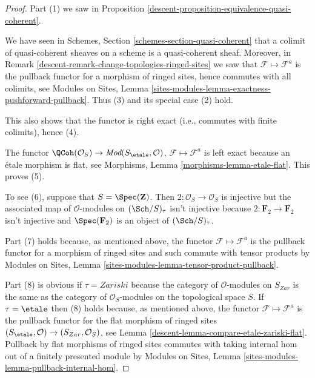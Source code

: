\begin{proof}

Part (1) we saw in
Proposition \ref{descent-proposition-equivalence-quasi-coherent}.

\medskip\noindent
We have seen in
Schemes, Section \ref{schemes-section-quasi-coherent}
that a colimit of quasi-coherent sheaves on a scheme is a quasi-coherent
sheaf. Moreover, in
Remark \ref{descent-remark-change-topologies-ringed-sites}
we saw that $\mathcal{F} \mapsto \mathcal{F}^a$ is the pullback functor
for a morphism of ringed sites, hence commutes with all colimits, see
Modules on Sites, Lemma
\ref{sites-modules-lemma-exactness-pushforward-pullback}.
Thus (3) and its special case (2) hold.

\medskip\noindent
This also shows that the functor is right exact (i.e., commutes with
finite colimits), hence (4).

\medskip\noindent
The functor $\QCoh(\mathcal{O}_S) \to
\textit{Mod}(S_\etale, \mathcal{O})$,
$\mathcal{F} \mapsto \mathcal{F}^a$
is left exact because an \'etale morphism is flat, see
Morphisms, Lemma \ref{morphisms-lemma-etale-flat}.
This proves (5).

\medskip\noindent
To see (6), suppose that $S = \Spec(\mathbf{Z})$.
Then $2 : \mathcal{O}_S \to \mathcal{O}_S$ is injective but the associated
map of $\mathcal{O}$-modules on $(\Sch/S)_\tau$ isn't
injective because $2 : \mathbf{F}_2 \to \mathbf{F}_2$ isn't injective
and $\Spec(\mathbf{F}_2)$ is an object of $(\Sch/S)_\tau$.

\medskip\noindent
Part (7) holds because, as mentioned above, the functor
$\mathcal{F} \mapsto \mathcal{F}^a$ is the pullback functor
for a morphism of ringed sites and such commute with tensor
products by Modules on Sites, Lemma
\ref{sites-modules-lemma-tensor-product-pullback}.

\medskip\noindent
Part (8) is obvious if $\tau = Zariski$ because the category of
$\mathcal{O}$-modules on $S_{Zar}$ is the same as the category
of $\mathcal{O}_S$-modules on the topological space $S$.
If $\tau = \etale$ then (8) holds because, as mentioned above,
the functor $\mathcal{F} \mapsto \mathcal{F}^a$ is the pullback functor
for the flat morphism of ringed sites
$(S_\etale, \mathcal{O}) \to (S_{Zar}, \mathcal{O}_S)$, see
Lemma \ref{descent-lemma-compare-etale-zariski-flat}.
Pullback by flat morphisms of ringed sites commutes with
taking internal hom out of a finitely presented module by
Modules on Sites, Lemma \ref{sites-modules-lemma-pullback-internal-hom}.


\end{proof}
